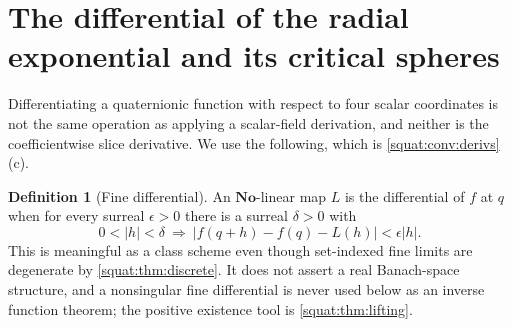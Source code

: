 \documentclass[11pt,letterpaper]{article}
\numberwithin{equation}{section}
\theoremstyle{definition}
\newtheorem{definition}[definition]{Definition}
\theoremstyle{remark}
\newcommand{\No}{\mathbf{No}}
\newcommand{\abs}[1]{\left|#1\right|}
\begin{document}
\section{The differential of the radial exponential and its critical spheres}\label{squat:sec:differential}

Differentiating a quaternionic function with respect to four scalar coordinates is not the
same operation as applying a scalar-field derivation, and neither is the coefficientwise
slice derivative. We use the following, which is \cref{squat:conv:derivs}(c).

\begin{definition}[Fine differential]\label{squat:def:fine-derivative}
An $\No$-linear map $L$ is the differential of $f$ at $q$ when for every surreal
$\epsilon>0$ there is a surreal $\delta>0$ with
\[
 0<\abs h<\delta\ \Longrightarrow\ \abs{f(q+h)-f(q)-L(h)}<\epsilon\abs h .
\]
This is meaningful as a class scheme even though set-indexed fine limits are degenerate by
\cref{squat:thm:discrete}. It does not assert a real Banach-space structure, and a
nonsingular fine differential is never used below as an inverse function theorem; the
positive existence tool is \cref{squat:thm:lifting}.
\end{definition}
\end{document}
